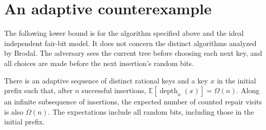 \section{An adaptive counterexample}

The following lower bound is for the algorithm specified above and the ideal
independent fair-bit model. It does not concern the distinct algorithms
analyzed by Brodal. The adversary sees the current tree before choosing each
next key, and all choices are made before the next insertion's random bits.

\begin{theorem}\label{thm:adaptive-lower}
There is an adaptive sequence of distinct rational keys and a key $x$ in the
initial prefix such that, after $n$ successful insertions,
$\mathbb E[\operatorname{depth}_n(x)]=\Omega(n)$. Along an infinite subsequence
of insertions, the expected number of counted repair visits is also $\Omega(n)$.
The expectations include all random bits, including those in the initial prefix.
\end{theorem}

